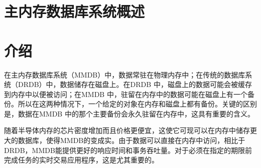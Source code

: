 \documentclass[translation]{zjutreport}
\begin{document}


\frontmatter %

\begingroup %
\let\clearpage\relax %



\titleformat{\chapter}[block]{\sihao\heiti\filcenter\bfseries}{\CJKnumber{\thechapter}}{1ex}{}{} %
\chapter*{主内存数据库系统概述}
{} %





\mainmatter%
\chapter{介绍}
在主内存数据库系统（MMDB）中，数据常驻在物理内存中；在传统的数据库系统（DRDB）中，数据储存在磁盘上。在DRDB 中，磁盘上的数据可能会被缓存到内存中以便被访问；在MMDB 中，驻留在内存中的数据可能在磁盘上有一个备份。所以在这两种情况下，一个给定的对象在内存和磁盘上都有备份。关键的区别是，数据在MMDB 中的那个主要备份会永久驻留在内存中，这具有重要的含义。

随着半导体内存的芯片密度增加而且价格更便宜，这使它可现可以在内存中储存更大的数据库，使得MMDB的变成实。由于数据可以直接在内存中访问，相比于DRDB，MMDB能提供更好的响应时间和事务吞吐量。对于必须在指定的期限前完成任务的实时交易应用程序，这是尤其重要的。
\end{document}
